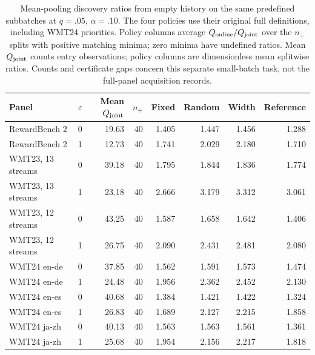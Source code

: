 \begin{table}[t]
\centering\small
\begin{tabular}{lrrrrrrr}
\toprule
Panel & $\varepsilon$ & Mean $Q_{\rm joint}$ & $n_+$ & Fixed & Random & Width & Reference \\
\midrule
RewardBench 2 & 0 & 19.63 & 40 & 1.405 & 1.447 & 1.456 & 1.288 \\
RewardBench 2 & 1 & 12.73 & 40 & 1.741 & 2.029 & 2.180 & 1.710 \\
WMT23, 13 streams & 0 & 39.18 & 40 & 1.795 & 1.844 & 1.836 & 1.774 \\
WMT23, 13 streams & 1 & 23.18 & 40 & 2.666 & 3.179 & 3.312 & 3.061 \\
WMT23, 12 streams & 0 & 43.25 & 40 & 1.587 & 1.658 & 1.642 & 1.406 \\
WMT23, 12 streams & 1 & 26.75 & 40 & 2.090 & 2.431 & 2.481 & 2.080 \\
WMT24 en-de & 0 & 37.85 & 40 & 1.562 & 1.591 & 1.573 & 1.474 \\
WMT24 en-de & 1 & 24.48 & 40 & 1.956 & 2.362 & 2.452 & 2.130 \\
WMT24 en-es & 0 & 40.68 & 40 & 1.384 & 1.421 & 1.422 & 1.324 \\
WMT24 en-es & 1 & 26.83 & 40 & 1.689 & 2.127 & 2.215 & 1.858 \\
WMT24 ja-zh & 0 & 40.13 & 40 & 1.563 & 1.563 & 1.561 & 1.361 \\
WMT24 ja-zh & 1 & 25.68 & 40 & 1.954 & 2.156 & 2.217 & 1.818 \\
\bottomrule
\end{tabular}
\caption{Mean-pooling discovery ratios from empty history on the same predefined subbatches at $q=.05$, $\alpha=.10$. The four policies use their original full definitions, including WMT24 priorities. Policy columns average $Q_{\rm online}/Q_{\rm joint}$ over the $n_+$ splits with positive matching minima; zero minima have undefined ratios. Mean $Q_{\rm joint}$ counts entry observations; policy columns are dimensionless mean splitwise ratios. Counts and certificate gaps concern this separate small-batch task, not the full-panel acquisition records.}
\label{tab:joint-discovery}
\end{table}

